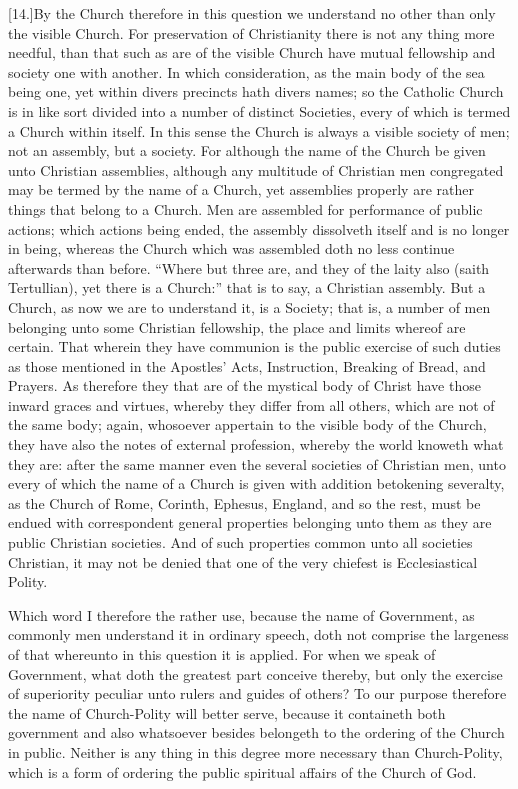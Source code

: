 [14.]By the Church therefore in this question we understand no other than only the visible Church. For preservation of Christianity there is not any thing more needful, than that such as are of the visible Church have mutual fellowship and society one with another. In which consideration, as the main body of the sea being one, yet within divers precincts hath divers names; so the Catholic Church is in like sort divided into a number of distinct Societies, every of which is termed a Church within itself. In this sense the Church is always a visible society of men; not an assembly, but a society. For although the name of the Church be given unto Christian assemblies, although any multitude of Christian men congregated may be termed by the name of a Church, yet assemblies properly are rather things that belong to a Church. Men are assembled for performance of public actions; which actions being ended, the assembly dissolveth itself and is no longer in being, whereas the Church which was assembled doth no less continue afterwards than before. “Where but three are, and they of the laity also (saith Tertullian), yet there is a Church:” that is to say, a Christian assembly. But a Church, as now we are to understand it, is a Society; that is, a number of men belonging unto some Christian fellowship, the place and limits whereof are certain. That wherein they have communion is the public exercise of such duties as those mentioned in the Apostles’ Acts, Instruction, Breaking of Bread, and Prayers. As therefore they that are of the mystical body of Christ have those inward graces and virtues,  whereby they differ from all others, which are not of the same body; again, whosoever appertain to the visible body of the Church, they have also the notes of external profession, whereby the world knoweth what they are: after the same manner even the several societies of Christian men, unto every of which the name of a Church is given with addition betokening severalty, as the Church of Rome, Corinth, Ephesus, England, and so the rest, must be endued with correspondent general properties belonging unto them as they are public Christian societies. And of such properties common unto all societies Christian, it may not be denied that one of the very chiefest is Ecclesiastical Polity.

Which word I therefore the rather use, because the name of Government, as commonly men understand it in ordinary speech, doth not comprise the largeness of that whereunto in this question it is applied. For when we speak of Government, what doth the greatest part conceive thereby, but only the exercise of superiority peculiar unto rulers and guides of others? To our purpose therefore the name of Church-Polity will better serve, because it containeth both government and also whatsoever besides belongeth to the ordering of the Church in public. Neither is any thing in this degree more necessary than Church-Polity, which is a form of ordering the public spiritual affairs of the Church of God.

